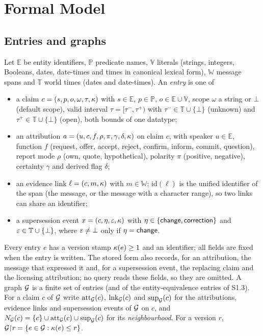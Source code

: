 \section{Formal Model}\label{sec:s-model}

\subsection{Entries and graphs}

Let $\mathbb E$ be entity identifiers, $\mathbb P$ predicate names, $\mathbb V$ literals (strings,
integers, Booleans, dates, date-times and times in canonical lexical form), $\mathbb W$ message
spans and $\mathbb T$ world times (dates and date-times). An \emph{entry} is one of
\begin{itemize}
\item a claim $c=(s,p,o,\omega,\tau,\kappa)$ with $s\in\mathbb E$, $p\in\mathbb P$,
  $o\in\mathbb E\cup\mathbb V$, scope $\omega$ a string or $\bot$ (default scope), valid interval
  $\tau=[\tau^-,\tau^+)$ with $\tau^-\in\mathbb T\cup\{\bot\}$ (unknown) and
  $\tau^+\in\mathbb T\cup\{\bot\}$ (open), both bounds of one datatype;
\item an attribution $a=(u,c,f,\rho,\pi,\gamma,\delta,\kappa)$ on claim $c$, with speaker
  $u\in\mathbb E$, function $f$ (request, offer, accept, reject, confirm, inform, commit,
  question), report mode $\rho$ (own, quote, hypothetical), polarity $\pi$ (positive, negative),
  certainty $\gamma$ and derived flag $\delta$;
\item an evidence link $\ell=(c,m,\kappa)$ with $m\in\mathbb W$; $\mathrm{id}(\ell)$ is the unified
  identifier of the span (the message, or the message with a character range), so two links can
  share an identifier;
\item a supersession event $x=(c,\eta,\varepsilon,\kappa)$ with $\eta\in\{\textsf{change},\textsf{correction}\}$ and
  $\varepsilon\in\mathbb T\cup\{\bot\}$, where $\varepsilon\neq\bot$ only if $\eta=\textsf{change}$.
\end{itemize}
Every entry $e$ has a version stamp $\kappa(e)\ge1$ and an identifier; all fields are fixed when the
entry is written. The stored form also records, for an attribution, the message that expressed
it and, for a supersession event, the replacing claim and the licensing attribution; no query
reads these fields, so they are omitted. A graph $\mathcal G$ is a finite set of entries (and of the
entity-equivalence entries of S1.3). For a claim $c$ of $\mathcal G$ write
$\mathrm{att}_\mathcal G(c)$, $\mathrm{lnk}_\mathcal G(c)$ and $\mathrm{sup}_\mathcal G(c)$ for the attributions, evidence links and
supersession events of $\mathcal G$ on $c$, and $N_\mathcal G(c)=\{c\}\cup\mathrm{att}_\mathcal G(c)\cup\mathrm{sup}_\mathcal G(c)$ for its
\emph{neighbourhood}. For a version $r$, $\mathcal G{\restriction}r=\{e\in\mathcal G:\kappa(e)\le r\}$.

